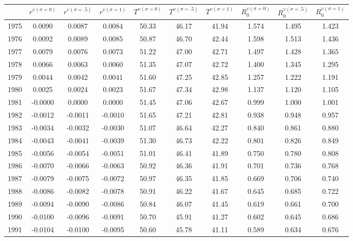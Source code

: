\begin{tabular}{cccccccccc}
  \hline
 & $r^{\upsilon (\sigma = 0)}$ & $r^{\upsilon (\sigma = .5)}$ & $r^{\upsilon (\sigma = 1)}$ & $T^{\upsilon (\sigma = 0)}$ & $T^{\upsilon (\sigma = .5)}$ & $T^{\upsilon (\sigma = 1)}$ & $R_0^{\upsilon (\sigma = 0)}$ & $R_0^{\upsilon (\sigma = .5)}$ & $R_0^{\upsilon (\sigma = 1)}$ \\ 
  \hline
1975 & 0.0090 & 0.0087 & 0.0084 & 50.33 & 46.17 & 41.94 & 1.574 & 1.495 & 1.423 \\ 
  1976 & 0.0092 & 0.0089 & 0.0085 & 50.87 & 46.70 & 42.44 & 1.598 & 1.513 & 1.436 \\ 
  1977 & 0.0079 & 0.0076 & 0.0073 & 51.22 & 47.00 & 42.71 & 1.497 & 1.428 & 1.365 \\ 
  1978 & 0.0066 & 0.0063 & 0.0060 & 51.35 & 47.07 & 42.72 & 1.400 & 1.345 & 1.295 \\ 
  1979 & 0.0044 & 0.0042 & 0.0041 & 51.60 & 47.25 & 42.85 & 1.257 & 1.222 & 1.191 \\ 
  1980 & 0.0025 & 0.0024 & 0.0023 & 51.67 & 47.34 & 42.98 & 1.137 & 1.120 & 1.105 \\ 
  1981 & -0.0000 & 0.0000 & 0.0000 & 51.45 & 47.06 & 42.67 & 0.999 & 1.000 & 1.001 \\ 
  1982 & -0.0012 & -0.0011 & -0.0010 & 51.65 & 47.21 & 42.81 & 0.938 & 0.948 & 0.957 \\ 
  1983 & -0.0034 & -0.0032 & -0.0030 & 51.07 & 46.64 & 42.27 & 0.840 & 0.861 & 0.880 \\ 
  1984 & -0.0043 & -0.0041 & -0.0039 & 51.30 & 46.73 & 42.22 & 0.801 & 0.826 & 0.849 \\ 
  1985 & -0.0056 & -0.0054 & -0.0051 & 51.01 & 46.41 & 41.89 & 0.750 & 0.780 & 0.808 \\ 
  1986 & -0.0070 & -0.0066 & -0.0063 & 50.92 & 46.36 & 41.91 & 0.701 & 0.736 & 0.768 \\ 
  1987 & -0.0079 & -0.0075 & -0.0072 & 50.97 & 46.35 & 41.85 & 0.669 & 0.706 & 0.740 \\ 
  1988 & -0.0086 & -0.0082 & -0.0078 & 50.91 & 46.22 & 41.67 & 0.645 & 0.685 & 0.722 \\ 
  1989 & -0.0094 & -0.0090 & -0.0086 & 50.84 & 46.07 & 41.45 & 0.619 & 0.661 & 0.700 \\ 
  1990 & -0.0100 & -0.0096 & -0.0091 & 50.70 & 45.91 & 41.27 & 0.602 & 0.645 & 0.686 \\ 
  1991 & -0.0104 & -0.0100 & -0.0095 & 50.60 & 45.78 & 41.11 & 0.589 & 0.634 & 0.676 \\ 

\end{tabular}
